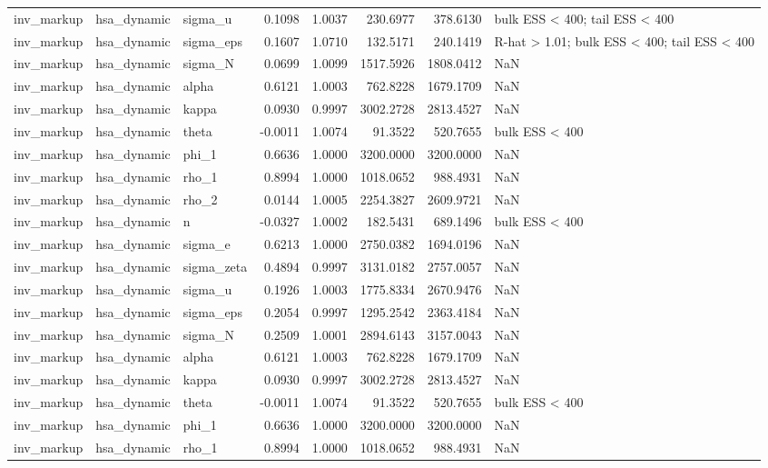 \begin{tabular}{lllrrrrl}
inv\_markup & hsa\_dynamic & sigma\_u & 0.1098 & 1.0037 & 230.6977 & 378.6130 & bulk ESS < 400; tail ESS < 400 \\
inv\_markup & hsa\_dynamic & sigma\_eps & 0.1607 & 1.0710 & 132.5171 & 240.1419 & R-hat > 1.01; bulk ESS < 400; tail ESS < 400 \\
inv\_markup & hsa\_dynamic & sigma\_N & 0.0699 & 1.0099 & 1517.5926 & 1808.0412 & NaN \\
inv\_markup & hsa\_dynamic & alpha & 0.6121 & 1.0003 & 762.8228 & 1679.1709 & NaN \\
inv\_markup & hsa\_dynamic & kappa & 0.0930 & 0.9997 & 3002.2728 & 2813.4527 & NaN \\
inv\_markup & hsa\_dynamic & theta & -0.0011 & 1.0074 & 91.3522 & 520.7655 & bulk ESS < 400 \\
inv\_markup & hsa\_dynamic & phi\_1 & 0.6636 & 1.0000 & 3200.0000 & 3200.0000 & NaN \\
inv\_markup & hsa\_dynamic & rho\_1 & 0.8994 & 1.0000 & 1018.0652 & 988.4931 & NaN \\
inv\_markup & hsa\_dynamic & rho\_2 & 0.0144 & 1.0005 & 2254.3827 & 2609.9721 & NaN \\
inv\_markup & hsa\_dynamic & n & -0.0327 & 1.0002 & 182.5431 & 689.1496 & bulk ESS < 400 \\
inv\_markup & hsa\_dynamic & sigma\_e & 0.6213 & 1.0000 & 2750.0382 & 1694.0196 & NaN \\
inv\_markup & hsa\_dynamic & sigma\_zeta & 0.4894 & 0.9997 & 3131.0182 & 2757.0057 & NaN \\
inv\_markup & hsa\_dynamic & sigma\_u & 0.1926 & 1.0003 & 1775.8334 & 2670.9476 & NaN \\
inv\_markup & hsa\_dynamic & sigma\_eps & 0.2054 & 0.9997 & 1295.2542 & 2363.4184 & NaN \\
inv\_markup & hsa\_dynamic & sigma\_N & 0.2509 & 1.0001 & 2894.6143 & 3157.0043 & NaN \\
inv\_markup & hsa\_dynamic & alpha & 0.6121 & 1.0003 & 762.8228 & 1679.1709 & NaN \\
inv\_markup & hsa\_dynamic & kappa & 0.0930 & 0.9997 & 3002.2728 & 2813.4527 & NaN \\
inv\_markup & hsa\_dynamic & theta & -0.0011 & 1.0074 & 91.3522 & 520.7655 & bulk ESS < 400 \\
inv\_markup & hsa\_dynamic & phi\_1 & 0.6636 & 1.0000 & 3200.0000 & 3200.0000 & NaN \\
inv\_markup & hsa\_dynamic & rho\_1 & 0.8994 & 1.0000 & 1018.0652 & 988.4931 & NaN \\

\end{tabular}
